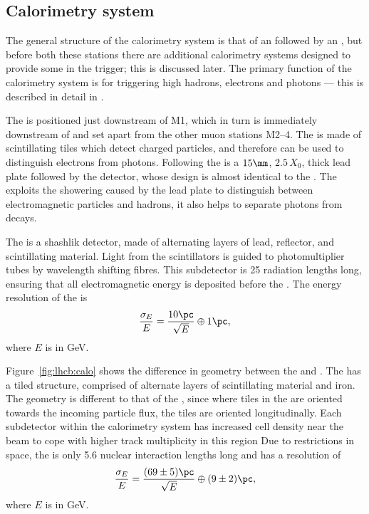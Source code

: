 \subsection{Calorimetry system}

The general structure of the calorimetry system is that of an \ecal followed by an \hcal, but
before both these stations there are additional calorimetry systems designed to provide some \pid
in the trigger; this is discussed later.
The primary function of the calorimetry system is for triggering high \pt hadrons, electrons and
photons --- this is described in detail in .

The \spd is positioned just downstream of M1, which in turn is immediately downstream of \richtwo
and set apart from the other muon stations M2--4.
The \spd is made of scintillating tiles which detect charged particles, and therefore can be used
to distinguish electrons from photons.
Following the \spd is a $15\mm$, $2.5\,X_0$, thick lead plate followed by the \presh detector,
whose design is almost identical to the \spd.
The \presh exploits the showering caused by the lead plate to distinguish between electromagnetic
particles and hadrons, it also helps to separate photons from \piz decays.

The \ecal is a shashlik detector, made of alternating layers of lead, reflector, and scintillating
material.
Light from the scintillators is guided to photomultiplier tubes by wavelength shifting fibres.
This \ecal subdetector is 25 radiation lengths long,  ensuring that all electromagnetic energy is
deposited before the \hcal.
The energy resolution of the \ecal is
\begin{equation}
  \frac{\sigma_E}{E} = \frac{10\pc}{\sqrt{E}} \oplus 1\pc,
\end{equation}
where $E$ is in GeV.

Figure~\ref{fig:lhcb:calo} shows the difference in geometry between the \ecal and \hcal.
The \hcal has a tiled structure, comprised of alternate layers of scintillating material and iron.
The geometry is different to that of the \ecal, since where tiles in the \ecal are oriented
towards the incoming particle flux, the \hcal tiles are oriented longitudinally.
Each subdetector within the calorimetry system has increased cell density near the beam to cope
with higher track multiplicity in this region
Due to restrictions in space, the \hcal is only 5.6 nuclear interaction lengths long and has a
resolution of
\begin{equation}
  \frac{\sigma_E}{E} = \frac{(69\pm5)\pc}{\sqrt{E}} \oplus (9\pm2)\pc,
\end{equation}
where $E$ is in GeV.

